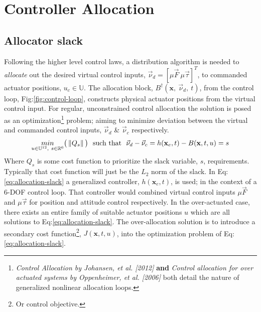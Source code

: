 \chapter{Controller Allocation}
\label{ch:allocation}
\section{Allocator slack}
\label{sec:allocation.slack}
Following the higher level control laws, a distribution algorithm is needed to \emph{allocate} out the desired virtual control inputs, $\vec{\nu}_d=[\mu\vec{F}~\mu\vec{\tau}]^T$, to commanded actuator positions, $u_c\in\mathbb{U}$. The allocation block, $B^\dagger(\mathbf{x},~\vec{\nu}_d,~t)$, from the control loop, Fig:\ref{fig:control-loop}, constructs physical actuator positions from the virtual control input. For regular, unconstrained control allocation the solution is posed as an optimization\footnote{\emph{Control Allocation by Johansen, et al. [2012]\cite{allocation}} \textbf{and} \emph{Control allocation for over actuated systems by Oppenheimer, et al. [2006]\cite{controlallocation}} both detail the nature of generalized nonlinear allocation loops.} problem; aiming to minimize deviation between the virtual and commanded control inputs, $\vec{\nu}_d$ \& $\vec{\nu}_c$ respectively.
\begin{equation}\label{eq:allocation-slack}
\underset{u\in\mathbb{U}^{12},~s\in\mathbb{R}^{6}}{min}\big(\left\lVert Q_s\right\rVert\big)~~\text{such that}~~\vec{\nu}_d-\vec{\nu}_c=h(\mathbf{x}_e,t)-B(\mathbf{x},t,u)=s
\end{equation}
Where $Q_s$ is some cost function to prioritize the slack variable, $s$, requirements. Typically that cost function will just be the $L_2$ norm of the slack. In Eq:\ref{eq:allocation-slack} a generalized controller, $h(\mathbf{x}_e,t)$, is used; in the context of a 6-DOF control loop. That controller would combined virtual control inputs $\mu\vec{F}$ and $\mu\vec{\tau}$ for position and attitude control respectively. In the over-actuated case, there exists an entire family of suitable actuator positions $u$ which are all solutions to Eq:\ref{eq:allocation-slack}. The over-allocation solution is to introduce a secondary cost function\footnote{Or control objective.}, $J(\mathbf{x},t,u)$, into the optimization problem of Eq:\ref{eq:allocation-slack}.
